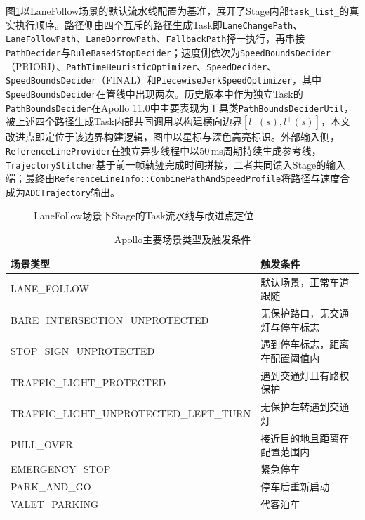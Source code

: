 图\ref{fig:planning_arch}以LaneFollow场景的默认流水线配置为基准，展开了Stage内部\texttt{task\_list\_}的真实执行顺序。路径侧由四个互斥的路径生成Task即\texttt{LaneChangePath}、\texttt{LaneFollowPath}、\texttt{LaneBorrowPath}、\texttt{FallbackPath}择一执行，再串接\texttt{PathDecider}与\texttt{RuleBasedStopDecider}；速度侧依次为\texttt{SpeedBoundsDecider}（PRIORI）、\texttt{PathTimeHeuristicOptimizer}、\texttt{SpeedDecider}、\texttt{SpeedBoundsDecider}（FINAL）和\texttt{PiecewiseJerkSpeedOptimizer}，其中\texttt{SpeedBoundsDecider}在管线中出现两次。历史版本中作为独立Task的\texttt{PathBoundsDecider}在Apollo 11.0中主要表现为工具类\texttt{PathBoundsDeciderUtil}，被上述四个路径生成Task内部共同调用以构建横向边界$[l^{-}(s), l^{+}(s)]$，本文改进点即定位于该边界构建逻辑，图中以星标与深色高亮标识。外部输入侧，\texttt{ReferenceLineProvider}在独立异步线程中以50\,ms周期持续生成参考线，\texttt{TrajectoryStitcher}基于前一帧轨迹完成时间拼接，二者共同馈入Stage的输入端；最终由\texttt{ReferenceLineInfo::CombinePathAndSpeedProfile}将路径与速度合成为\texttt{ADCTrajectory}输出。

\begin{figure}[htbp]
\centering
{}
\caption{LaneFollow场景下Stage的Task流水线与改进点定位}
\label{fig:planning_arch}
\end{figure}

\begin{table}[htbp]
\centering
\caption{Apollo主要场景类型及触发条件}
\label{tab:scenarios}
\small
\begin{tabularx}{\textwidth}{lX}
\toprule
场景类型 & \textbf{触发条件} \\
\midrule
LANE\_FOLLOW & 默认场景，正常车道跟随 \\
BARE\_INTERSECTION\_UNPROTECTED & 无保护路口，无交通灯与停车标志 \\
STOP\_SIGN\_UNPROTECTED & 遇到停车标志，距离在配置阈值内 \\
TRAFFIC\_LIGHT\_PROTECTED & 遇到交通灯且有路权保护 \\
TRAFFIC\_LIGHT\_UNPROTECTED\_LEFT\_TURN & 无保护左转遇到交通灯 \\
PULL\_OVER & 接近目的地且距离在配置范围内 \\
EMERGENCY\_STOP & 紧急停车 \\
PARK\_AND\_GO & 停车后重新启动 \\
VALET\_PARKING & 代客泊车 \\
\bottomrule
\end{tabularx}
\end{table}

